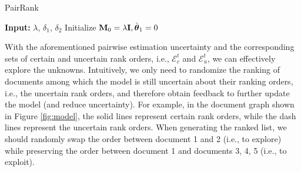 \begin{algorithm}[t]
\caption{PairRank}
\label{algo:algo1}
    \textbf{Input:} $\lambda$, $\delta_1$, $\delta_2$
    Initialize $\mathbf{M}_0 = \lambda \mathbf{I}, \hat{\boldsymbol{\theta}}_1 = 0$
\end{algorithm}

With the aforementioned pairwise estimation uncertainty and the corresponding sets of certain and uncertain rank orders, i.e., $\mathcal{E}_c^t$ and $\mathcal{E}_u^t$, we can effectively explore the unknowns.
Intuitively, we only need to randomize the ranking of documents among which the model is still uncertain about their ranking orders, i.e., the uncertain rank orders, and therefore obtain feedback to further update the model (and reduce uncertainty). 
For example, in the document graph shown in Figure \ref{fig:model}, the solid lines represent certain rank orders, while the dash lines represent the uncertain rank orders. When generating the ranked list, we should randomly swap the order between document 1 and 2 (i.e., to explore) while preserving the order between document 1 and documents 3, 4, 5 (i.e., to exploit).

